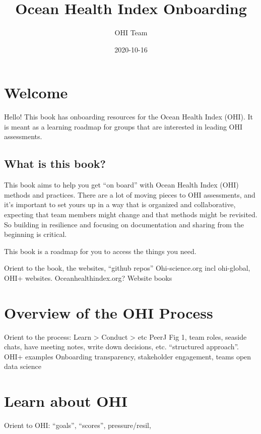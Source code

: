 \documentclass[
]{book}
\title{Ocean Health Index Onboarding}
\author{OHI Team}
\date{2020-10-16}
\begin{document}
\maketitle

{
\setcounter{tocdepth}{1}
\tableofcontents
}
\hypertarget{welcome}{%
\chapter{Welcome}\label{welcome}}

Hello! This book has onboarding resources for the Ocean Health Index (OHI). It is meant as a learning roadmap for groups that are interested in leading OHI assessments.

\hypertarget{what-is-this-book}{%
\section{What is this book?}\label{what-is-this-book}}

This book aims to help you get ``on board'' with Ocean Health Index (OHI) methods and practices. There are a lot of moving pieces to OHI assessments, and it's important to set yours up in a way that is organized and collaborative, expecting that team members might change and that methods might be revisited. So building in resilience and focusing on documentation and sharing from the beginning is critical.

This book is a roadmap for you to access the things you need.

Orient to the book, the websites, ``github repos''
Ohi-science.org incl ohi-global, OHI+ websites.
Oceanhealthindex.org? Website
books

\hypertarget{process}{%
\chapter{Overview of the OHI Process}\label{process}}

Orient to the process: Learn \textgreater{} Conduct \textgreater{} etc
PeerJ Fig 1, team roles, seaside chats, have meeting notes, write down decisions, etc. ``structured approach''.
OHI+ examples
Onboarding
transparency, stakeholder engagement, teams open data science

\hypertarget{ohi}{%
\chapter{Learn about OHI}\label{ohi}}

Orient to OHI: ``goals'', ``scores'', pressure/resil,
\end{document}

